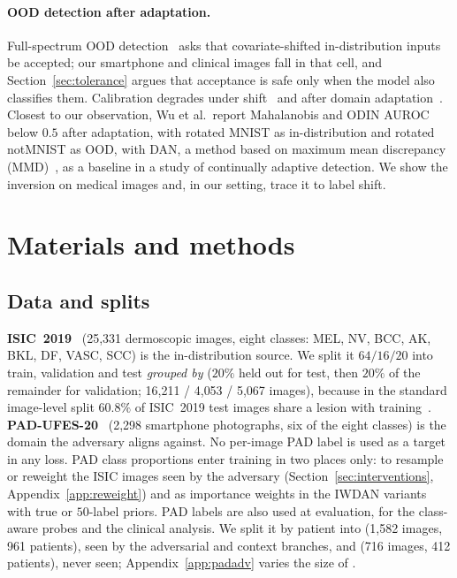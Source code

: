 \documentclass{midl}
\begin{document}
\paragraph{OOD detection after adaptation.}
Full-spectrum OOD detection~\cite{yang2023,zhang2023} asks that covariate-shifted
in-distribution inputs be accepted; our smartphone and clinical images fall in that cell,
and Section~\ref{sec:tolerance} argues that acceptance is safe only when the model also
classifies them. Calibration degrades under shift~\cite{ovadia2019} and after domain
adaptation~\cite{wang2020}. Closest to our observation, Wu et al.\ report Mahalanobis and
ODIN AUROC below $0.5$ after adaptation, with rotated MNIST as in-distribution and rotated
notMNIST as OOD, with DAN, a method based on maximum mean
discrepancy (MMD)~\cite{wu2023meta}, as a baseline in a study of continually adaptive detection. We
show the inversion on medical images and, in our setting, trace it to label shift.

\section{Materials and methods}

\subsection{Data and splits}\label{sec:data}

\textbf{ISIC~2019}~\cite{tschandl2018,codella2018,combalia2019} (25{,}331 dermoscopic images, eight classes: MEL, NV,
BCC, AK, BKL, DF, VASC, SCC) is the in-distribution source. We split it $64/16/20$ into
train, validation and test \emph{grouped by} \texttt{} ($20\%$ held out for test, then $20\%$ of the remainder for validation; 16{,}211 / 4{,}053 /
5{,}067 images), because in the standard image-level split $60.8\%$ of ISIC~2019 test images share a lesion with
training~\cite{leakagepaper}. \textbf{PAD-UFES-20}~\cite{pacheco2020} (2{,}298 smartphone
photographs, six of the eight classes) is the domain the adversary aligns against. No
per-image PAD label is used as a target in any loss. PAD class proportions enter training in
two places only: to resample or reweight the ISIC images seen by the adversary (Section~\ref{sec:interventions},
Appendix~\ref{app:reweight}) and as importance weights in the IWDAN variants with true or $50$-label priors. PAD labels are
also used at evaluation, for the class-aware probes and the clinical analysis. We split it by patient into \texttt{} (1{,}582
images, 961 patients), seen by the adversarial and context branches, and
\texttt{} (716 images, 412 patients), never seen; Appendix~\ref{app:padadv} varies the size of \texttt{}.
\end{document}
